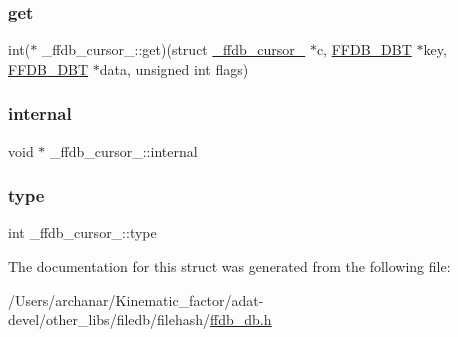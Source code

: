 \mbox{\label{struct__ffdb__cursor___a775458eba1f9b1d69b9b394faaf31ae2}} 
\subsubsection{\texorpdfstring{get}{get}}
{\footnotesize\ttfamily int($\ast$ \+\_\+ffdb\+\_\+cursor\+\_\+\+::get)(struct \mbox{\hyperlink{struct__ffdb__cursor__}{\+\_\+ffdb\+\_\+cursor\+\_\+}} $\ast$c, \mbox{\hyperlink{adat-devel_2other__libs_2filedb_2filehash_2ffdb__db_8h_aa2e0984399491df0fdd20898ca8758f9}{F\+F\+D\+B\+\_\+\+D\+BT}} $\ast$key, \mbox{\hyperlink{adat-devel_2other__libs_2filedb_2filehash_2ffdb__db_8h_aa2e0984399491df0fdd20898ca8758f9}{F\+F\+D\+B\+\_\+\+D\+BT}} $\ast$data, unsigned int flags)}

\mbox{\label{struct__ffdb__cursor___a1c07d3b46c0463000411b3a8819f928e}} 
\subsubsection{\texorpdfstring{internal}{internal}}
{\footnotesize\ttfamily void $\ast$ \+\_\+ffdb\+\_\+cursor\+\_\+\+::internal}

\mbox{\label{struct__ffdb__cursor___a19f215e12f2d09687f089c87c7b00f29}} 
\subsubsection{\texorpdfstring{type}{type}}
{\footnotesize\ttfamily int \+\_\+ffdb\+\_\+cursor\+\_\+\+::type}



The documentation for this struct was generated from the following file\+:\begin{DoxyCompactItemize}
\item 
/\+Users/archanar/\+Kinematic\+\_\+factor/adat-\/devel/other\+\_\+libs/filedb/filehash/\mbox{\hyperlink{adat-devel_2other__libs_2filedb_2filehash_2ffdb__db_8h}{ffdb\+\_\+db.\+h}}\end{DoxyCompactItemize}
